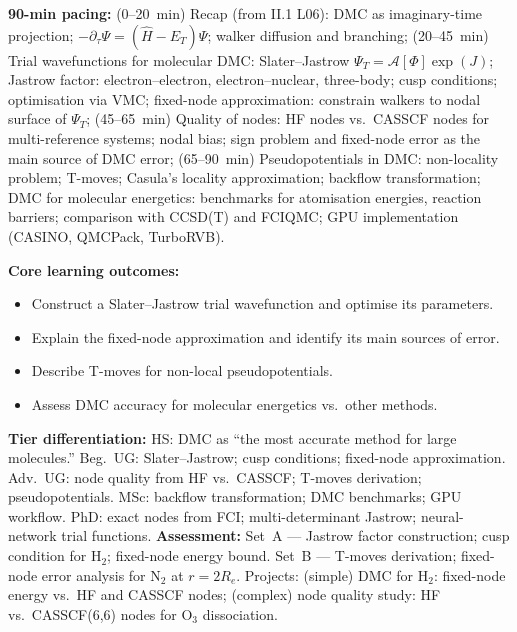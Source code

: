 \documentclass[11pt,a4paper]{article}
\begin{document}
\medskip

\begin{tcolorbox}[chembox, title={Module~III.3 / L11: Diffusion Quantum Monte Carlo for Molecules}]
\textbf{90-min pacing:} (0--20~min) Recap (from II.1 L06): DMC as imaginary-time projection; $-\partial_\tau\Psi=(\hat{H}-E_T)\Psi$; walker diffusion and branching; (20--45~min) Trial wavefunctions for molecular DMC: Slater--Jastrow $\Psi_T=\mathcal{A}[\Phi]\exp(J)$; Jastrow factor: electron--electron, electron--nuclear, three-body; cusp conditions; optimisation via VMC; fixed-node approximation: constrain walkers to nodal surface of $\Psi_T$; (45--65~min) Quality of nodes: HF nodes vs.\ CASSCF nodes for multi-reference systems; nodal bias; sign problem and fixed-node error as the main source of DMC error; (65--90~min) Pseudopotentials in DMC: non-locality problem; T-moves; Casula's locality approximation; backflow transformation; DMC for molecular energetics: benchmarks for atomisation energies, reaction barriers; comparison with CCSD(T) and FCIQMC; GPU implementation (CASINO, QMCPack, TurboRVB).

\medskip\textbf{Core learning outcomes:}
\begin{itemize}[leftmargin=1.4em,topsep=2pt,itemsep=1pt]
  \item Construct a Slater--Jastrow trial wavefunction and optimise its parameters.
  \item Explain the fixed-node approximation and identify its main sources of error.
  \item Describe T-moves for non-local pseudopotentials.
  \item Assess DMC accuracy for molecular energetics vs.\ other methods.
\end{itemize}
\medskip\textbf{Tier differentiation:}
HS: DMC as ``the most accurate method for large molecules.''
Beg.\ UG: Slater--Jastrow; cusp conditions; fixed-node approximation.
Adv.\ UG: node quality from HF vs.\ CASSCF; T-moves derivation; pseudopotentials.
MSc: backflow transformation; DMC benchmarks; GPU workflow.
PhD: exact nodes from FCI; multi-determinant Jastrow; neural-network trial functions.
\medskip\textbf{Assessment:}
Set~A --- Jastrow factor construction; cusp condition for H$_2$; fixed-node energy bound.
Set~B --- T-moves derivation; fixed-node error analysis for N$_2$ at $r=2R_e$.
Projects: (simple) DMC for H$_2$: fixed-node energy vs.\ HF and CASSCF nodes; (complex) node quality study: HF vs.\ CASSCF(6,6) nodes for O$_3$ dissociation.
\end{tcolorbox}
\end{document}
